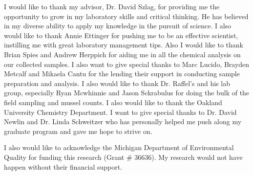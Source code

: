
I would like to thank my advisor, Dr. David Szlag, for providing me the opportunity to grow in my laboratory skills and critical thinking. He has believed in my diverse ability to apply my knowledge in the pursuit of science. I also would like to thank Annie Ettinger for pushing me to be an effective scientist, instilling me with great laboratory management tips.  Also I would like to thank Brian Spies and Andrew Herppich for aiding me in all the chemical analysis on our collected samples. I also want to give special thanks to Marc Lucido, Brayden Metcalf and Mikaela Cantu for the lending their support in conducting sample preparation and analysis. I also would like to thank Dr. Raffel's and his lab group, especially Ryan Mcwhinnie and Jason Sckrabulus for doing the bulk of the field sampling and mussel counts.  I also would like to thank the Oakland University Chemistry Department. I want to give special thanks to Dr. David Newlin and Dr. Linda Schweitzer who has personally helped me push along my graduate program and gave me hope to strive on.

I also would like to acknowledge the Michigan Department of Environmental Quality for funding this research (Grant \# 36636). My research would not have happen without their financial support.
